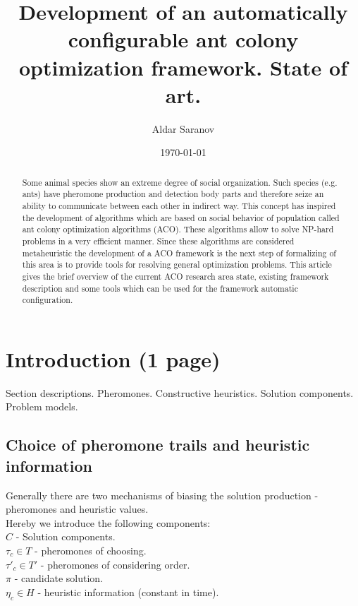 \documentclass[12pt]{article}
\author{Aldar Saranov}
\date{\today}
\title{Development of an automatically configurable ant colony optimization framework. State of art.}
\begin{document}
\maketitle 
\newpage

\tableofcontents
\newpage

\begin{abstract}
Some animal species show an extreme degree of social organization. Such species (e.g. ants) have pheromone production and detection body parts and therefore seize an ability to communicate between each other in indirect way. This concept has inspired the development of algorithms which are based on social behavior of population called ant colony optimization algorithms (ACO). These algorithms allow to solve NP-hard problems in a very efficient manner. Since these algorithms are considered metaheuristic the development of a ACO framework is the next step of formalizing of this area is to provide tools for resolving general optimization problems. This article gives the brief overview of the current ACO research area state, existing framework description and some tools which can be used for the framework automatic configuration.
\end{abstract}



\section{Introduction (1 page)}
Section descriptions.
Pheromones.
Constructive heuristics.
Solution components.
Problem models.




\subsection{Choice of pheromone trails and heuristic information}

Generally there are two mechanisms of biasing the solution production - pheromones and heuristic values. \\
Hereby we introduce the following components: \\
$C$ - Solution components. \\
$\tau_c \in T$ - pheromones of choosing. \\
$\tau'_c \in T'$ - pheromones of considering order. \\
$\pi$ - candidate solution. \\
$\eta_c \in H$ - heuristic information (constant in time). \\
\end{document}
